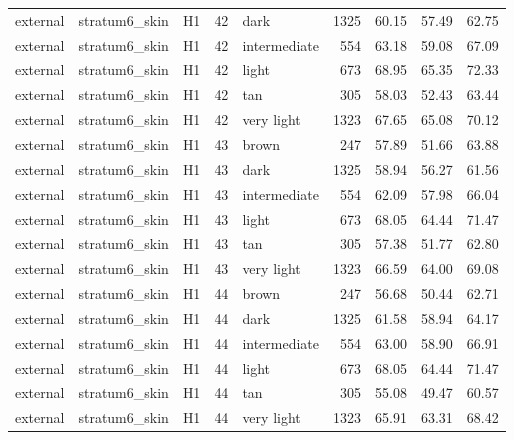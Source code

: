 \begin{tabular}{lllrlrrrr}
external & stratum6\_skin & H1 & 42 & dark & 1325 & 60.15 & 57.49 & 62.75 \\
external & stratum6\_skin & H1 & 42 & intermediate & 554 & 63.18 & 59.08 & 67.09 \\
external & stratum6\_skin & H1 & 42 & light & 673 & 68.95 & 65.35 & 72.33 \\
external & stratum6\_skin & H1 & 42 & tan & 305 & 58.03 & 52.43 & 63.44 \\
external & stratum6\_skin & H1 & 42 & very light & 1323 & 67.65 & 65.08 & 70.12 \\
external & stratum6\_skin & H1 & 43 & brown & 247 & 57.89 & 51.66 & 63.88 \\
external & stratum6\_skin & H1 & 43 & dark & 1325 & 58.94 & 56.27 & 61.56 \\
external & stratum6\_skin & H1 & 43 & intermediate & 554 & 62.09 & 57.98 & 66.04 \\
external & stratum6\_skin & H1 & 43 & light & 673 & 68.05 & 64.44 & 71.47 \\
external & stratum6\_skin & H1 & 43 & tan & 305 & 57.38 & 51.77 & 62.80 \\
external & stratum6\_skin & H1 & 43 & very light & 1323 & 66.59 & 64.00 & 69.08 \\
external & stratum6\_skin & H1 & 44 & brown & 247 & 56.68 & 50.44 & 62.71 \\
external & stratum6\_skin & H1 & 44 & dark & 1325 & 61.58 & 58.94 & 64.17 \\
external & stratum6\_skin & H1 & 44 & intermediate & 554 & 63.00 & 58.90 & 66.91 \\
external & stratum6\_skin & H1 & 44 & light & 673 & 68.05 & 64.44 & 71.47 \\
external & stratum6\_skin & H1 & 44 & tan & 305 & 55.08 & 49.47 & 60.57 \\
external & stratum6\_skin & H1 & 44 & very light & 1323 & 65.91 & 63.31 & 68.42 \\
\bottomrule
\end{tabular}
